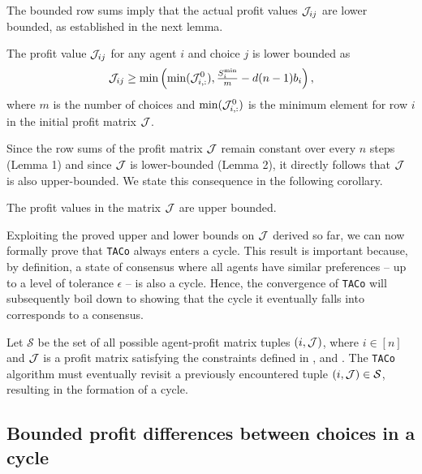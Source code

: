 The bounded row sums imply that the actual profit values $\mathcal{J}_{ij}$ are lower bounded, as established in the next lemma.

\begin{lemma} \label{theorem:lemma2}
The profit value $\mathcal{J}_{ij}$ for any agent $i$ and choice $j$ is lower bounded as
\begin{equation}
    \mathcal{J}_{ij} \geq \min\left(\min(\mathcal{J}_{i,:}^{0}), \textstyle{\frac{S_i^{\mathrm{min}}}{m}} - d(n-1)b_i\right),
\end{equation}
where $m$ is the number of choices and  $\min(\mathcal{J}_{i,:}^{0})$ is the minimum element for row $i$ in the initial profit matrix $\mathcal{J}$.
\end{lemma}

Since the row sums of the profit matrix $\mathcal{J}$ remain constant over every $n$ steps (Lemma 1) and since $\mathcal{J}$ is lower-bounded (Lemma 2), it directly follows that  $\mathcal{J}$ is also upper-bounded. We state this consequence in the following corollary.


\begin{corollary} \label{theorem:corollary1}
 The profit values in the matrix $\mathcal{J}$ are upper bounded.
\end{corollary}


Exploiting the proved upper and lower bounds on $\mathcal{J}$ derived so far, we can now formally prove that \texttt{TACo} always enters a cycle. This result is important because, by definition, a state of consensus where all agents have similar preferences -- up to a level of tolerance $\epsilon$ -- is also a cycle. Hence, the convergence of \texttt{TACo} will subsequently boil down to showing that the cycle it eventually falls into corresponds to a consensus.

\begin{theorem} \label{theorem:theorem1}
Let $\mathcal{S}$ be the set of all possible agent-profit matrix tuples $(i, \mathcal{J})$, where $i \in [n]$ and $\mathcal{J}$ is a profit matrix satisfying the constraints defined in 
,  and . The \texttt{TACo} algorithm must eventually revisit a previously encountered tuple $(i, \mathcal{J}) \in \mathcal{S}$, resulting in the formation of a cycle.
\end{theorem}

\subsection{Bounded profit differences between choices in a cycle}

